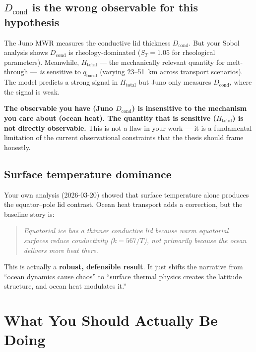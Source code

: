 \documentclass[11pt,a4paper]{article}
\begin{document}
\subsection{$D_\mathrm{cond}$ is the wrong observable for this hypothesis}

The Juno MWR measures the conductive lid thickness $D_\mathrm{cond}$. But
your Sobol analysis shows $D_\mathrm{cond}$ is rheology-dominated
($S_T = 1.05$ for rheological parameters). Meanwhile, $H_\mathrm{total}$
--- the mechanically relevant quantity for melt-through --- \textit{is}
sensitive to $q_\mathrm{basal}$ (varying 23--51~km across transport
scenarios). The model predicts a strong signal in $H_\mathrm{total}$ but
Juno only measures $D_\mathrm{cond}$, where the signal is weak.

\begin{critical}
\textbf{The observable you have (Juno $D_\mathrm{cond}$) is insensitive to
the mechanism you care about (ocean heat). The quantity that is sensitive
($H_\mathrm{total}$) is not directly observable.} This is not a flaw in
your work --- it is a fundamental limitation of the current observational
constraints that the thesis should frame honestly.
\end{critical}

\subsection{Surface temperature dominance}

Your own analysis (2026-03-20) showed that surface temperature alone
produces the equator--pole lid contrast. Ocean heat transport adds a
correction, but the baseline story is:
\begin{quote}
\textit{Equatorial ice has a thinner conductive lid because warm equatorial
surfaces reduce conductivity ($k = 567/T$), not primarily because the ocean
delivers more heat there.}
\end{quote}

This is actually a \textbf{robust, defensible result}. It just shifts the
narrative from ``ocean dynamics cause chaos'' to ``surface thermal physics
creates the latitude structure, and ocean heat modulates it.''

\section{What You Should Actually Be Doing}
\end{document}

